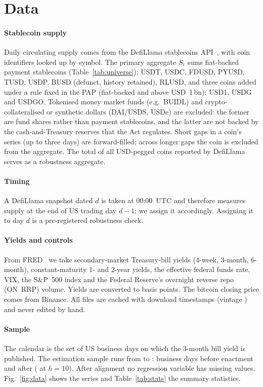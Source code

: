 \section{Data}\label{sec:data}

\paragraph*{Stablecoin supply} Daily circulating supply comes from the DefiLlama stablecoins API~\cite{defillama}, with coin identifiers looked up by symbol. The primary aggregate $S_t$ sums \nCoins{} fiat-backed payment stablecoins (Table~\ref{tab:universe}): USDT, USDC, FDUSD, PYUSD, TUSD, USDP, BUSD (defunct, history retained), RLUSD, and three coins added under a rule fixed in the PAP (fiat-backed and above USD~1\,bn): USD1, USDG and USDGO. Tokenised money market funds (e.g.\ BUIDL) and crypto-collateralised or synthetic dollars (DAI/USDS, USDe) are excluded: the former are fund shares rather than payment stablecoins, and the latter are not backed by the cash-and-Treasury reserves that the Act regulates. Short gaps in a coin's series (up to three days) are forward-filled; across longer gaps the coin is excluded from the aggregate. The total of all USD-pegged coins reported by DefiLlama serves as a robustness aggregate.

\paragraph*{Timing} A DefiLlama snapshot dated $d$ is taken at 00:00~UTC and therefore measures supply at the end of US trading day $d-1$; we assign it accordingly. Assigning it to day $d$ is a pre-registered robustness check.

\paragraph*{Yields and controls} From FRED~\cite{fred} we take secondary-market Treasury-bill yields (4-week, 3-month, 6-month), constant-maturity 1- and 2-year yields, the effective federal funds rate, VIX, the S\&P~500 index and the Federal Reserve's overnight reverse repo (ON~RRP) volume. Yields are converted to basis points. The bitcoin closing price comes from Binance. All files are cached with download timestamps (vintage \vintage{}) and never edited by hand.

\paragraph*{Sample} The calendar is the set of US business days on which the 3-month bill yield is published. The estimation sample runs from \sampleStart{} to \sampleEnd{}: \nPre{} business days before enactment and \nPost{} after (\nPostTen{} at $h=10$). After alignment no regression variable has missing values. Fig.~\ref{fig:data} shows the series and Table~\ref{tab:stats} the summary statistics.

